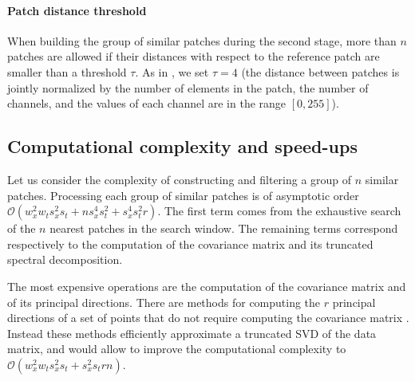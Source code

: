 \documentclass[10pt, journal, twocolumn, final, a4paper]{IEEEtran}
\begin{document}

\paragraph{Patch distance threshold} When building the group of similar
patches during the second stage, more than $n$ patches are allowed
if their distances with respect to the reference patch are smaller than a
threshold $\tau$.  As in \cite{Lebrun2013ipol}, we set $\tau = 4$ (the distance between
patches is jointly normalized by the number of elements in the patch, the number of
channels, and the values of each channel are in the range  $[0,255]$).


\subsection{Computational complexity and speed-ups}
\label{sse:complexity}

Let us consider the complexity of constructing and filtering a group of
$n$ similar patches.
Processing each group of similar patches is of asymptotic order $\mathcal
O(w_x^2 w_t s_x^2 s_t + ns_x^4s_t^2 + s_x^4s_t^2r)$.
The first term comes from the exhaustive search of the $n$ nearest patches in
the search window.  The remaining terms correspond respectively to the
computation of the covariance matrix and its truncated spectral decomposition.

The most expensive operations are the computation of the covariance matrix and
of its principal directions.
There are methods for computing the $r$ principal directions
of a set of points that do not require computing the covariance matrix
\cite{Halko2011}. Instead these methods efficiently approximate a truncated SVD
of the data matrix, and would 
allow to improve the computational complexity to $\mathcal O(w_x^2 w_t s_x^2
s_t + s_x^2s_trn)$.
\end{document}
